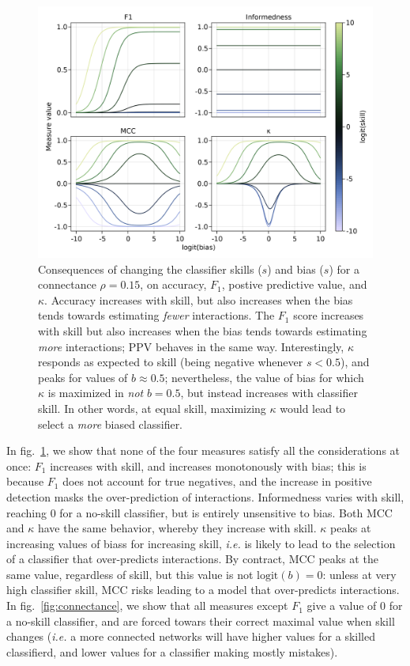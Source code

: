 \documentclass[11pt]{article}
\makeatletter
\def\maxwidth{\ifdim\Gin@nat@width>\linewidth\linewidth
\else\Gin@nat@width\fi}
\let\Oldincludegraphics\includegraphics
\renewcommand{\includegraphics}[1]{\Oldincludegraphics[width=\maxwidth]{#1}}
\makeatother
\begin{document}
\begin{figure}
\hypertarget{fig:bias}{%
\centering
\includegraphics{figures/changing-bias.png}
\caption{Consequences of changing the classifier skills (\(s\)) and bias
(\(s\)) for a connectance \(\rho=0.15\), on accuracy, \(F_1\), postive
predictive value, and \(\kappa\). Accuracy increases with skill, but
also increases when the bias tends towards estimating \emph{fewer}
interactions. The \(F_1\) score increases with skill but also increases
when the bias tends towards estimating \emph{more} interactions; PPV
behaves in the same way. Interestingly, \(\kappa\) responds as expected
to skill (being negative whenever \(s < 0.5\)), and peaks for values of
\(b \approx 0.5\); nevertheless, the value of bias for which \(\kappa\)
is maximized in \emph{not} \(b=0.5\), but instead increases with
classifier skill. In other words, at equal skill, maximizing \(\kappa\)
would lead to select a \emph{more} biased classifier.}\label{fig:bias}
}
\end{figure}

In fig.~\ref{fig:bias}, we show that none of the four measures satisfy
all the considerations at once: \(F_1\) increases with skill, and
increases monotonously with bias; this is because \(F_1\) does not
account for true negatives, and the increase in positive detection masks
the over-prediction of interactions. Informedness varies with skill,
reaching 0 for a no-skill classifier, but is entirely unsensitive to
bias. Both MCC and \(\kappa\) have the same behavior, whereby they
increase with skill. \(\kappa\) peaks at increasing values of biass for
increasing skill, \emph{i.e.} is likely to lead to the selection of a
classifier that over-predicts interactions. By contract, MCC peaks at
the same value, regardless of skill, but this value is not
\(\text{logit}(b)=0\): unless at very high classifier skill, MCC risks
leading to a model that over-predicts interactions. In
fig.~\ref{fig:connectance}, we show that all measures except \(F_1\)
give a value of 0 for a no-skill classifier, and are forced towars their
correct maximal value when skill changes (\emph{i.e.} a more connected
networks will have higher values for a skilled classifierd, and lower
values for a classifier making mostly mistakes).
\end{document}
